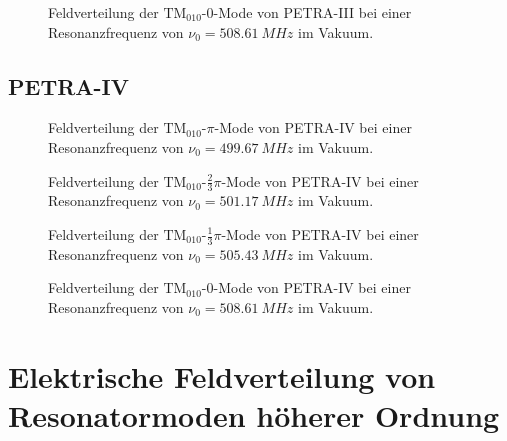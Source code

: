 \begin{figure}[h]
  \centering
  
  \caption[Feldverteilung der $\mathrm{TM}_{010}\text{-}0$-Mode von PETRA-III]{Feldverteilung der $\mathrm{TM}_{010}\text{-}0$-Mode von PETRA-III bei einer Resonanzfrequenz von $\nu_0 = \SI{508.61}{MHz}$ im Vakuum.}
\end{figure}
\FloatBarrier

\subsection{PETRA-IV}
\FloatBarrier
\begin{figure}[h]
  \centering
  
  \caption[Feldverteilung der $\mathrm{TM}_{010}\text{-}\pi$-Mode von PETRA-IV]{Feldverteilung der $\mathrm{TM}_{010}\text{-}\pi$-Mode von PETRA-IV bei einer Resonanzfrequenz von $\nu_0 = \SI{499.67}{MHz}$ im Vakuum.}
\end{figure}

\begin{figure}[h]
  \centering
  
  \caption[Feldverteilung der $\mathrm{TM}_{010}\text{-}\frac{2}{3}\pi$-Mode von PETRA-IV]{Feldverteilung der $\mathrm{TM}_{010}\text{-}\frac{2}{3}\pi$-Mode von PETRA-IV bei einer Resonanzfrequenz von $\nu_0 = \SI{501.17}{MHz}$ im Vakuum.}
\end{figure}

\begin{figure}[h]
  \centering
  
  \caption[Feldverteilung der $\mathrm{TM}_{010}\text{-}\frac{1}{3}\pi$-Mode von PETRA-IV]{Feldverteilung der $\mathrm{TM}_{010}\text{-}\frac{1}{3}\pi$-Mode von PETRA-IV bei einer Resonanzfrequenz von $\nu_0 = \SI{505.43}{MHz}$ im Vakuum.}
\end{figure}

\begin{figure}[h]
  \centering
  
  \caption[Feldverteilung der $\mathrm{TM}_{010}\text{-}0$-Mode von PETRA-IV]{Feldverteilung der $\mathrm{TM}_{010}\text{-}0$-Mode von PETRA-IV bei einer Resonanzfrequenz von $\nu_0 = \SI{508.61}{MHz}$ im Vakuum.}
\end{figure}
\FloatBarrier

\section{Elektrische Feldverteilung von Resonatormoden höherer Ordnung}
\label{app:hom_felder}
\FloatBarrier

